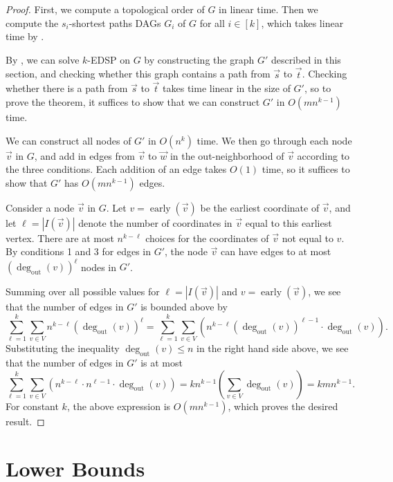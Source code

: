 \documentclass[11pt]{article}
\newcommand{\grp}[1]{\left(#1\right)}
\DeclareMathOperator{\early}{early}
\newcommand{\outdeg}{\deg_{\text{out}}}
\theoremstyle{definition}
\begin{document}
\edsp*
\begin{proof}

    First, we compute a topological order of $G$ in linear time.
    Then we compute the $s_i$-shortest paths DAGs $G_i$ of $G$ for all $i\in [k]$, which takes linear time by .

    By , we can solve \textsf{$k$-EDSP} on $G$ by constructing the graph $G'$ described in 
    this section,
    and checking whether this graph contains a path from $\vec{s}$ to $\vec{t}$.
    Checking whether there is a path from $\vec{s}$ to $\vec{t}$ takes time linear in the size of $G'$, so to prove the theorem, it suffices to show that we can construct $G'$ in $O(mn^{k-1})$ time.


    We can construct all nodes of $G'$ in $O(n^k)$ time.
    We then go through each node $\vec{v}$ in $G$, and add in edges from $\vec{v}$ to $\vec{w}$ in the out-neighborhood of $\vec{v}$ according to the three conditions.
    Each addition of an edge takes $O(1)$ time, so it suffices to show that $G'$ has $O(mn^{k-1})$ edges.

    Consider a node $\vec{v}$ in $G$.
    Let $v = \early(\vec{v})$ be the earliest coordinate of $\vec{v}$, and let $\ell = |I(\vec{v})|$ denote the number of coordinates in $\vec{v}$ equal to this earliest vertex.
    There are at most $n^{k-\ell}$ choices for the coordinates of $\vec{v}$ not equal to $v$.
    By conditions 1 and 3 for edges in $G'$, the node $\vec{v}$  can have edges to at most $\grp{\outdeg(v)}^\ell$ nodes in $G'$.

    Summing over all possible values for $\ell = |I(\vec{v})|$ and $v=\early(\vec{v})$, we see that the number of edges in $G'$ is bounded above by 
        \[\sum_{\ell=1}^{k}\sum_{v\in V}  n^{k-\ell}\grp{\outdeg(v)}^\ell = \sum_{\ell=1}^{k} \sum_{v\in V} \grp{n^{k-\ell}\grp{\outdeg(v)}^{\ell-1}\cdot \outdeg(v)}.\]
    Substituting the inequality $\outdeg(v)\le n$ in the right hand side above, we see that the number of edges in $G'$ is at most 
    \[\sum_{\ell=1}^{k} \sum_{v\in V} \grp{n^{k-\ell}\cdot n^{\ell-1}\cdot \outdeg(v)} = kn^{k-1} \grp{\sum_{v\in V} \outdeg(v)} = kmn^{k-1}.\]
    For constant $k$, the above expression is $O(mn^{k-1})$, which proves the desired result.
\end{proof}

\section{Lower Bounds}\label{sec:lb}
\end{document}
